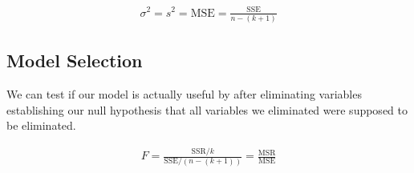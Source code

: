    \begin{equation*}
        \begin{aligned}
            \sigma^2 = s^2 = \text{MSE} = \frac{\text{SSE} }{n - (k + 1)}
        \end{aligned}
    \end{equation*}

    \subsection{Model Selection}
    We can test if our model is actually useful by after eliminating variables establishing our null hypothesis that all
    variables we eliminated were supposed to be eliminated.

    \begin{equation*}
        \begin{aligned}
            F = \frac{\text{SSR}/k}{\text{SSE} / (n - (k + 1))} = \frac{\text{MSR} }{\text{MSE} }
        \end{aligned}
    \end{equation*}
